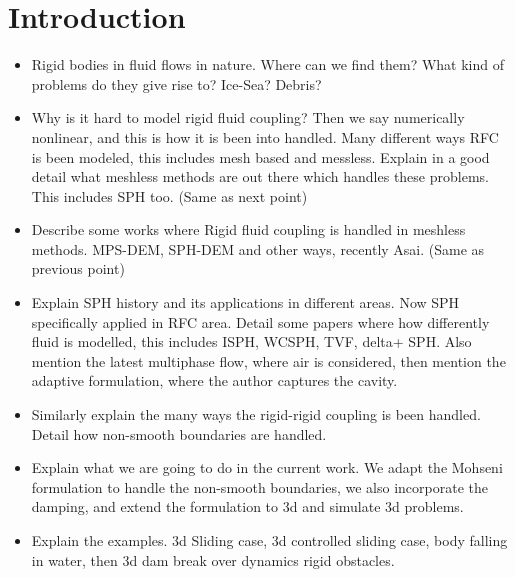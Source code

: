 \documentclass[preprint,12pt]{elsarticle}
\newcommand{\todoin}{\todo[inline]}
\begin{document}
\section{Introduction}
\label{sec:intro}
\begin{itemize}
\item Rigid bodies in fluid flows in nature. Where can we find them? What kind
  of problems do they give rise to? Ice-Sea? Debris?
\item Why is it hard to model rigid fluid coupling? Then we say numerically
  nonlinear, and this is how it is been into handled. Many different ways RFC
  is been modeled, this includes mesh based and messless. Explain in a good
  detail what meshless methods are out there which handles these problems.
  This includes SPH too. (Same as next point)
\item \todoin{Done} Describe some works where Rigid fluid coupling is handled
  in meshless methods. MPS-DEM, SPH-DEM and other ways, recently Asai. (Same
  as previous point)
\item Explain SPH history and its applications in different areas. Now SPH
  specifically applied in RFC area. Detail some papers where how differently
  fluid is modelled, this includes ISPH, WCSPH, TVF, delta+ SPH. Also mention
  the latest multiphase flow, where air is considered, then mention the
  adaptive formulation, where the author captures the cavity.
\item \todoin{Done} Similarly explain the many ways the rigid-rigid coupling is been
  handled. Detail how non-smooth boundaries are handled.
\item \todoin{Done} Explain what we are going to do in the current work. We adapt the
  Mohseni formulation to handle the non-smooth boundaries, we also incorporate
  the damping, and extend the formulation to 3d and simulate 3d problems.
\item Explain the examples. 3d Sliding case, 3d controlled sliding case, body
  falling in water, then 3d dam break over dynamics rigid obstacles.
\end{itemize}
\end{document}
